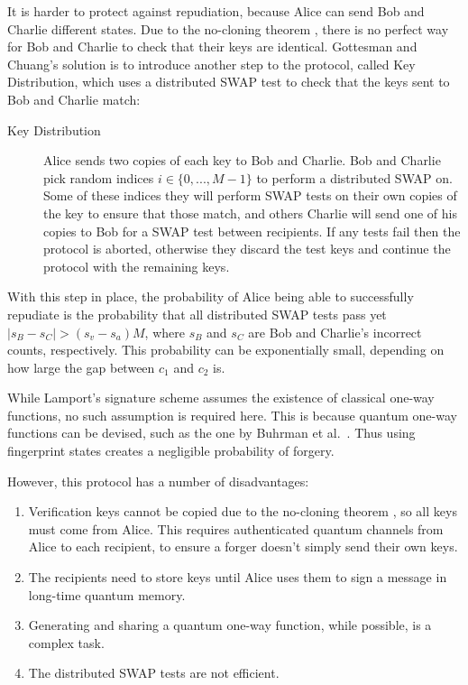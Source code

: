 \documentclass[%
 reprint,
 amsmath,amssymb,
 aps,
 pra,
]{revtex4-1}
\begin{document}
It is harder to protect against repudiation, because Alice can send Bob and Charlie different states. Due to the no-cloning theorem \cite{WZ82}, there is no perfect way for Bob and Charlie to check that their keys are identical. Gottesman and Chuang's solution is to introduce another step to the protocol, called Key Distribution, which uses a distributed SWAP test to check that the keys sent to Bob and Charlie match:

\begin{description}
\item[Key Distribution]Alice sends two copies of each key to Bob and Charlie. Bob and Charlie pick random indices $i \in \{0,...,M-1\}$ to perform a distributed SWAP on. Some of these indices they will perform SWAP tests on their own copies of the key to ensure that those match, and others Charlie will send one of his copies to Bob for a SWAP test between recipients. If any tests fail then the protocol is aborted, otherwise they discard the test keys and continue the protocol with the remaining keys.
\end{description}

With this step in place, the probability of Alice being able to successfully repudiate is the probability that all distributed SWAP tests pass yet $|s_B - s_C| > (s_v - s_a)M$, where $s_B$ and $s_C$ are Bob and Charlie's incorrect counts, respectively. This probability can be exponentially small, depending on how large the gap between $c_1$ and $c_2$ is.

While Lamport's signature scheme assumes the existence of classical one-way functions, no such assumption is required here. This is because quantum one-way functions can be devised, such as the one by Buhrman et al.~\cite{PhysRevLett.87.167902}. Thus using fingerprint states creates a negligible probability of forgery.

However, this protocol has a number of disadvantages:

\begin{enumerate}
\item Verification keys cannot be copied due to the no-cloning theorem \cite{WZ82}, so all keys must come from Alice. This requires authenticated quantum channels from Alice to each recipient, to ensure a forger doesn't simply send their own keys.
\item The recipients need to store keys until Alice uses them to sign a message in long-time quantum memory.
\item Generating and sharing a quantum one-way function, while possible, is a complex task.
\item The distributed SWAP tests are not efficient.
\end{enumerate}
\end{document}
